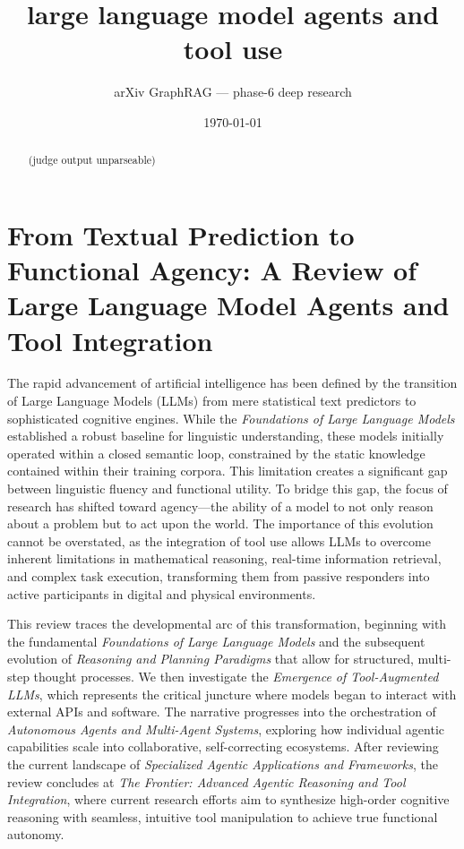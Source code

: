 \documentclass[11pt]{article}
\title{large language model agents and tool use}
\author{arXiv GraphRAG --- phase-6 deep research}
\date{\today}
\begin{document}
\maketitle

\begin{abstract}
(judge output unparseable)
\end{abstract}

\section{From Textual Prediction to Functional Agency: A Review of Large Language Model Agents and Tool Integration}

The rapid advancement of artificial intelligence has been defined by the transition of Large Language Models (LLMs) from mere statistical text predictors to sophisticated cognitive engines. While the \textit{Foundations of Large Language Models} established a robust baseline for linguistic understanding, these models initially operated within a closed semantic loop, constrained by the static knowledge contained within their training corpora. This limitation creates a significant gap between linguistic fluency and functional utility. To bridge this gap, the focus of research has shifted toward agency—the ability of a model to not only reason about a problem but to act upon the world. The importance of this evolution cannot be overstated, as the integration of tool use allows LLMs to overcome inherent limitations in mathematical reasoning, real-time information retrieval, and complex task execution, transforming them from passive responders into active participants in digital and physical environments.

This review traces the developmental arc of this transformation, beginning with the fundamental \textit{Foundations of Large Language Models} and the subsequent evolution of \textit{Reasoning and Planning Paradigms} that allow for structured, multi-step thought processes. We then investigate the \textit{Emergence of Tool-Augmented LLMs}, which represents the critical juncture where models began to interact with external APIs and software. The narrative progresses into the orchestration of \textit{Autonomous Agents and Multi-Agent Systems}, exploring how individual agentic capabilities scale into collaborative, self-correcting ecosystems. After reviewing the current landscape of \textit{Specialized Agentic Applications and Frameworks}, the review concludes at \textit{The Frontier: Advanced Agentic Reasoning and Tool Integration}, where current research efforts aim to synthesize high-order cognitive reasoning with seamless, intuitive tool manipulation to achieve true functional autonomy.
\end{document}
